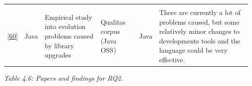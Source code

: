 \documentclass[]{book}
\begin{document}
\begin{longtable}[]{@{}llllll@{}}
\begin{minipage}[t]{0.11\columnwidth}
\end{minipage}\tabularnewline
\begin{minipage}[t]{0.10\columnwidth}\raggedright\strut
{[}\protect\hyperlink{ref-Dietrich2014}{60}{]}\strut
\end{minipage} & \begin{minipage}[t]{0.18\columnwidth}\raggedright\strut
Java\strut
\end{minipage} & \begin{minipage}[t]{0.19\columnwidth}\raggedright\strut
Empirical study into evolution problems caused by library upgrades\strut
\end{minipage} & \begin{minipage}[t]{0.11\columnwidth}\raggedright\strut
Qualitas corpus (Java OSS)\strut
\end{minipage} & \begin{minipage}[t]{0.13\columnwidth}\raggedright\strut
Java\strut
\end{minipage} & \begin{minipage}[t]{0.11\columnwidth}\raggedright\strut
There are currently a lot of problems caused, but some relatively minor
changes to developments tools and the language could be very
effective.\strut
\end{minipage}\tabularnewline
\bottomrule
\end{longtable}

\emph{Table 4.6: Papers and findings for RQ2.}
\end{document}
